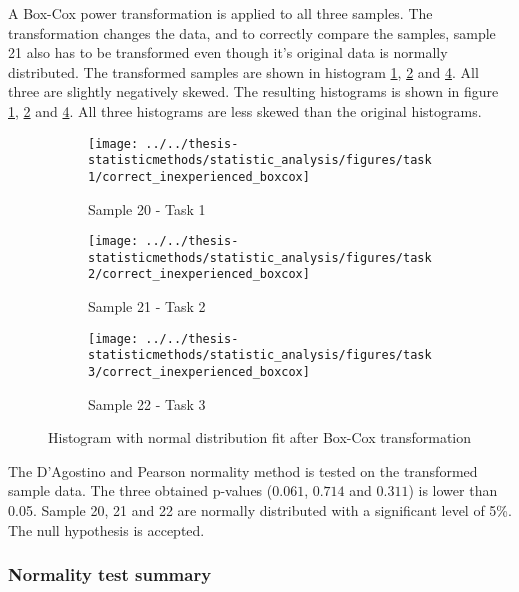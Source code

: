 A Box-Cox power transformation is applied to all three samples. The transformation changes the data, and to correctly compare the samples, sample 21 also has to be transformed even though it's original data is normally distributed. The transformed samples are shown in histogram \ref{fig:correctinexperiencedboxcox_task1}, \ref{fig:correctinexperiencedboxcox_task2} and \ref{fig:correctinexperiencedboxcox_task3}. All three are slightly negatively skewed. The resulting histograms is shown in figure \ref{fig:correctinexperiencedboxcox_task1}, \ref{fig:correctinexperiencedboxcox_task2} and \ref{fig:correctinexperiencedboxcox_task3}. All three histograms are less skewed than the original histograms.

\begin{figure}[H]
	\centering
	\begin{subfigure}[b]{0.32\textwidth}
		\centering
		\texttt{[image: ../../thesis-statisticmethods/statistic\_analysis/figures/task1/correct\_inexperienced\_boxcox]}
		\caption{Sample 20 - Task 1}
		\label{fig:correctinexperiencedboxcox_task1}
	\end{subfigure}
	\begin{subfigure}[b]{0.32\textwidth}
		\centering
		\texttt{[image: ../../thesis-statisticmethods/statistic\_analysis/figures/task2/correct\_inexperienced\_boxcox]}
		\caption{Sample 21 - Task 2}
		\label{fig:correctinexperiencedboxcox_task2}
	\end{subfigure}
	\begin{subfigure}[b]{0.32\textwidth}
		\centering
		\texttt{[image: ../../thesis-statisticmethods/statistic\_analysis/figures/task3/correct\_inexperienced\_boxcox]}
		\caption{Sample 22 - Task 3}
		\label{fig:correctinexperiencedboxcox_task3}
	\end{subfigure}
	\caption{Histogram with normal distribution fit after Box-Cox transformation}
\end{figure}

The D'Agostino and Pearson normality method is tested on the transformed sample data. The three obtained p-values ($0.061$, $0.714$ and $0.311$) is lower than 0.05. Sample 20, 21 and 22 are normally distributed with a significant level of 5\%. The null hypothesis is accepted. 

\subsubsection{Normality test summary}\label{sec:normaltest_summary}

